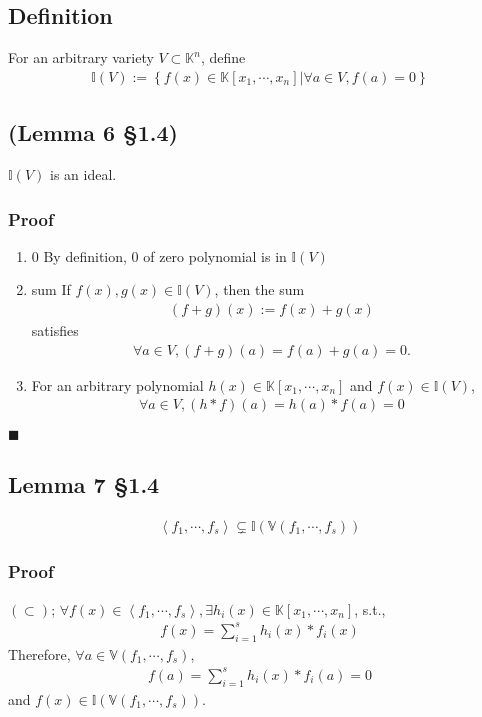 \documentclass[11pt]{book}
\begin{document}
\subsection{Definition}
For an arbitrary variety $V \subset \mathbb{K}^n$, define
\begin{eqnarray}
\mathbb{I}(V) := \left\{\left. f(x) \in \mathbb{K}[x_1,\cdots,x_n] \right| \forall a \in V, f(a) = 0 \right\}
\end{eqnarray}

\subsection{(Lemma 6 \S1.4)}
$\mathbb{I}(V)$ is an ideal.

\subsubsection{Proof}
\begin{enumerate}
\item 0
By definition, 0 of zero polynomial is in $\mathbb{I}(V)$

\item sum
If $f(x), g(x) \in \mathbb{I}(V)$, then the sum
\begin{eqnarray}
(f + g)(x) := f(x) + g(x)
\end{eqnarray}
satisfies
\begin{eqnarray}
\forall a \in V, (f + g)(a) = f(a) + g(a) = 0.
\end{eqnarray}

\item
For an arbitrary polynomial $h(x) \in \mathbb{K}[x_1,\cdots,x_n]$ and $f(x) \in \mathbb{I}(V)$,
\begin{eqnarray}
\forall a \in V, (h*f)(a) = h(a) * f(a) = 0
\end{eqnarray}

\end{enumerate}
$\blacksquare$

\subsection{Lemma 7 \S1.4}
\begin{eqnarray}
\left< f_1, \cdots, f_s \right> \subsetneq \mathbb{I}\left( \mathbb{V} \left( f_1, \cdots, f_s \right) \right)
\end{eqnarray}

\subsubsection{Proof}
$(\subset)$; $\forall f(x) \in \left< f_1, \cdots, f_s \right>, \exists h_i(x) \in \mathbb{K}[x_1,\cdots,x_n]$, s.t.,
\begin{eqnarray}
f(x) = \sum_{i=1}^s h_i(x) * f_i(x)
\end{eqnarray}
Therefore, $\forall a \in \mathbb{V} \left( f_1, \cdots, f_s \right)$,
\begin{eqnarray}
f(a) = \sum_{i=1}^s h_i(x) * f_i(a) = 0
\end{eqnarray}
and $f(x) \in \mathbb{I}\left( \mathbb{V} \left( f_1, \cdots, f_s \right) \right)$.
\end{document}
